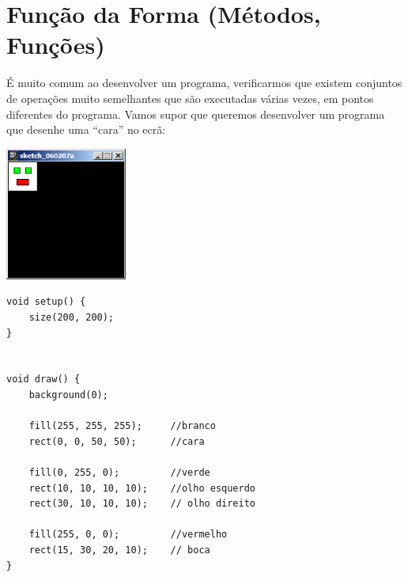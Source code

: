 \chapter{Função da Forma (Métodos, Funções)}\label{cap:funcoes}


É muito comum ao desenvolver um programa, verificarmos que existem conjuntos de operações muito semelhantes
que são executadas várias vezes, em pontos diferentes do programa. 
Vamos supor que queremos desenvolver um programa que desenhe uma ``cara'' no ecrã:
\begin{center}
	\includegraphics[width=4cm]{images/cara.eps}
\end{center}
\begin{lstlisting}
void setup() {
    size(200, 200);
}


void draw() {
    background(0);
    
    fill(255, 255, 255);     //branco
    rect(0, 0, 50, 50);      //cara
    
    fill(0, 255, 0);         //verde
    rect(10, 10, 10, 10);    //olho esquerdo
    rect(30, 10, 10, 10);    // olho direito
    
    fill(255, 0, 0);         //vermelho
    rect(15, 30, 20, 10);    // boca
}
\end{lstlisting}

